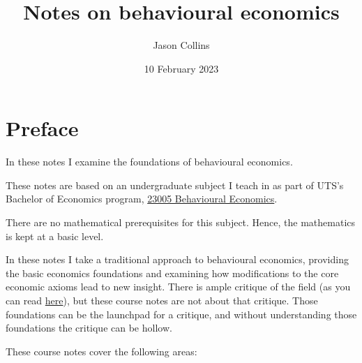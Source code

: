 \documentclass[
  letterpaper,
  DIV=11,
  numbers=noendperiod]{scrreprt}
\title{Notes on behavioural economics}
\author{Jason Collins}
\date{10 February 2023}
\renewcommand*\contentsname{Table of contents}
\newcommand\contentsname{Table of contents}
\begin{document}
\maketitle
\ifdefined\Shaded\renewenvironment{Shaded}{\begin{tcolorbox}[borderline west={3pt}{0pt}{shadecolor}, boxrule=0pt, sharp corners, breakable, interior hidden, enhanced, frame hidden]}{\end{tcolorbox}}\fi

\renewcommand*\contentsname{Table of contents}
{
\hypersetup{linkcolor=}
\setcounter{tocdepth}{2}
\tableofcontents
}

\hypertarget{preface}{%
\chapter*{Preface}\label{preface}}


In these notes I examine the foundations of behavioural economics.

These notes are based on an undergraduate subject I teach in as part of
UTS's Bachelor of Economics program,
\href{https://handbook.uts.edu.au/subjects/23005.html}{23005 Behavioural
Economics}.

There are no mathematical prerequisites for this subject. Hence, the
mathematics is kept at a basic level.

In these notes I take a traditional approach to behavioural economics,
providing the basic economics foundations and examining how
modifications to the core economic axioms lead to new insight. There is
ample critique of the field (as you can read
\href{https://www.jasoncollins.blog/a-critical-behavioural-economics-and-behavioural-science-reading-list/}{here}),
but these course notes are not about that critique. Those foundations
can be the launchpad for a critique, and without understanding those
foundations the critique can be hollow.

These course notes cover the following areas:
\end{document}
